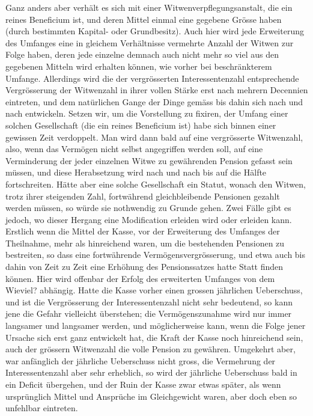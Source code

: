 \documentclass[12pt,a4paper]{article}
\begin{document}
Ganz anders aber verh\"alt es sich mit einer Witwenverpflegungsanstalt, die ein reines Beneficium ist, und deren Mittel einmal eine gegebene Gr\"osse haben (durch bestimmten Kapital- oder Grundbesitz). Auch hier wird jede Erweiterung des Umfanges eine in gleichem Verh\"altnisse vermehrte Anzahl der Witwen zur Folge haben, deren jede einzelne demnach auch nicht mehr so viel aus den gegebenen Mitteln wird erhalten k\"onnen, wie vorher bei beschr\"ankterem Umfange. Allerdings wird die der vergr\"osserten Interessentenzahl entsprechende Vergr\"osserung der Witwenzahl in ihrer vollen St\"arke erst nach mehrern Decennien eintreten, und dem nat\"urlichen Gange der Dinge gem\"ass bis dahin sich nach und nach entwickeln. Setzen wir, um die Vorstellung zu fixiren, der Umfang einer solchen Gesellschaft (die ein reines Beneficium ist) habe sich binnen einer gewissen Zeit verdoppelt. Man wird dann bald auf eine vergr\"osserte Witwenzahl, also, wenn das Verm\"ogen nicht selbst angegriffen werden soll, auf eine Verminderung der jeder einzelnen Witwe zu gew\"ahrenden Pension gefasst sein m\"ussen, und diese Herabsetzung wird nach und nach bis auf die H\"alfte fortschreiten. H\"atte aber eine solche Gesellschaft ein Statut, wonach den Witwen, trotz ihrer steigenden Zahl, fortw\"ahrend gleichbleibende Pensionen gezahlt werden m\"ussen, so w\"urde sie nothwendig zu Grunde gehen. Zwei F\"alle gibt es jedoch, wo dieser Hergang eine Modification erleiden wird oder erleiden kann. Erstlich wenn die Mittel der Kasse, vor der Erweiterung des Umfanges der Theilnahme, mehr als hinreichend waren, um die bestehenden Pensionen zu bestreiten, so dass eine fortw\"ahrende Verm\"ogensvergr\"osserung, und etwa auch bis dahin von Zeit zu Zeit eine Erh\"ohung des Pensionssatzes hatte Statt finden k\"onnen. Hier wird offenbar der Erfolg des erweiterten Umfanges von dem Wieviel? abh\"angig. Hatte die Kasse vorher einen grossen j\"ahrlichen Ueberschuss, und ist die Vergr\"osserung der Interessentenzahl nicht sehr bedeutend, so kann jene die Gefahr vielleicht \"uberstehen; die Verm\"ogenszunahme wird nur immer langsamer und langsamer werden, und m\"oglicherweise kann, wenn die Folge jener Ursache sich erst ganz entwickelt hat, die Kraft der Kasse noch hinreichend sein, auch der gr\"ossern Witwenzahl die volle Pension zu gew\"ahren. Umgekehrt aber, war anf\"anglich der j\"ahrliche Ueberschuss nicht gross, die Vermehrung der Interessentenzahl aber sehr erheblich, so wird der j\"ahrliche Ueberschuss bald in ein Deficit \"ubergehen, und der Ruin der Kasse zwar etwas sp\"ater, als wenn urspr\"unglich Mittel und Anspr\"uche im Gleichgewicht waren, aber doch eben so unfehlbar eintreten.
\end{document}
